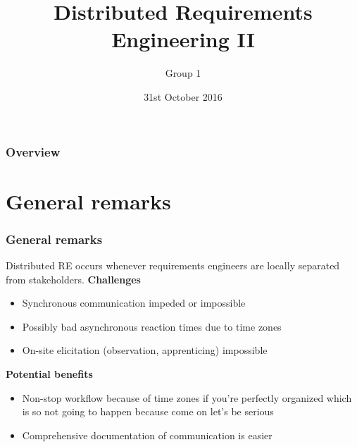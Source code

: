 \documentclass{beamer}
\title[Distributed RE II]{Distributed Requirements Engineering II} %
\author{Group 1}
\date{31st October 2016}
\begin{document}
\begin{frame}
\titlepage
\end{frame}

\begin{frame}
\frametitle{Overview} %
\tableofcontents %
\end{frame}


\section{General remarks}
\begin{frame}
\frametitle{General remarks}
Distributed RE occurs whenever requirements engineers are locally separated from stakeholders.
\vfill
\textbf{Challenges}
\begin{itemize}
\item Synchronous communication impeded or impossible
\item Possibly bad asynchronous reaction times due to time zones
\item On-site elicitation (observation, apprenticing) impossible
\end{itemize}

\textbf{Potential benefits}
\begin{itemize}
\item Non-stop workflow because of time zones if you're perfectly organized which is so not going to happen because come on let's be serious
\item Comprehensive documentation of communication is easier
\end{itemize}
\end{frame}

\end{document}

